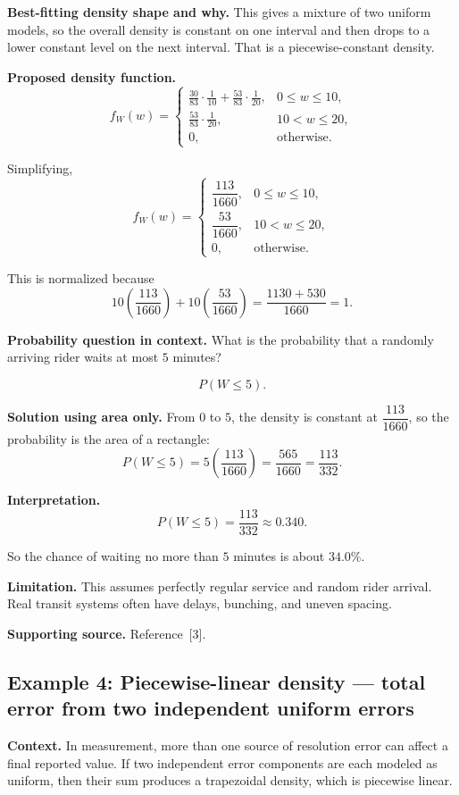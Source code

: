 \documentclass[11pt]{article}
\begin{document}
	\textbf{Best-fitting density shape and why.} This gives a mixture of two uniform models, so the overall density is constant on one interval and then drops to a lower constant level on the next interval. That is a piecewise-constant density.
	
	\textbf{Proposed density function.}
	\[
	f_W(w)=
	\begin{cases}
		\frac{30}{83}\cdot \frac{1}{10}+\frac{53}{83}\cdot \frac{1}{20}, & 0\le w\le 10,\\[8pt]
		\frac{53}{83}\cdot \frac{1}{20}, & 10<w\le 20,\\
		0, & \text{otherwise}.
	\end{cases}
	\]
	
	Simplifying,
	\[
	f_W(w)=
	\begin{cases}
		\dfrac{113}{1660}, & 0\le w\le 10,\\[6pt]
		\dfrac{53}{1660}, & 10<w\le 20,\\
		0, & \text{otherwise}.
	\end{cases}
	\]
	
	This is normalized because
	\[
	10\left(\frac{113}{1660}\right)+10\left(\frac{53}{1660}\right)
	=\frac{1130+530}{1660}=1.
	\]
	
	\textbf{Probability question in context.} What is the probability that a randomly arriving rider waits at most $5$ minutes?
	
	\[
	P(W\le 5).
	\]
	
	\textbf{Solution using area only.} From $0$ to $5$, the density is constant at $\dfrac{113}{1660}$, so the probability is the area of a rectangle:
	\[
	P(W\le 5)=5\left(\frac{113}{1660}\right)=\frac{565}{1660}=\frac{113}{332}.
	\]
	
	\textbf{Interpretation.}
	\[
	P(W\le 5)=\frac{113}{332}\approx 0.340.
	\]
	
	So the chance of waiting no more than $5$ minutes is about $34.0\%$.
	
	\textbf{Limitation.} This assumes perfectly regular service and random rider arrival. Real transit systems often have delays, bunching, and uneven spacing.
	
	\textbf{Supporting source.} Reference \,[3].
	
	\subsection{Example 4: Piecewise-linear density --- total error from two independent uniform errors}
	
	\textbf{Context.} In measurement, more than one source of resolution error can affect a final reported value. If two independent error components are each modeled as uniform, then their sum produces a trapezoidal density, which is piecewise linear.
	
\end{document}
